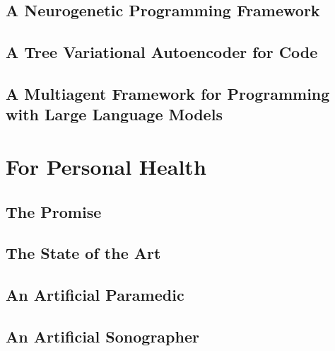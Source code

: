 \newpage
\chapter{A Neurogenetic Programming Framework}\label{ch:neurogen}


\newpage
\chapter{A Tree Variational Autoencoder for Code}\label{ch:tree2tree}


\newpage
\chapter{A Multiagent Framework for Programming with Large Language Models}\label{ch:seidr}


\part{For Personal Health}
\newpage
\chapter{The Promise} \label{ch:health-motiv}


\newpage
\chapter{The State of the Art} \label{ch:health-sota}


\newpage
\chapter{An Artificial Paramedic} \label{ch:virtu-als}



\newpage
\chapter{An Artificial Sonographer} \label{ch:imagym}


